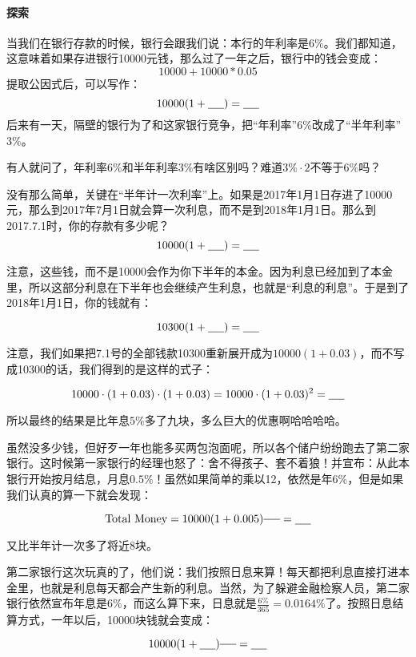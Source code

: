 \documentclass[UTF8]{ctexart}
\begin{document}
\paragraph{探索}
当我们在银行存款的时候，银行会跟我们说：本行的年利率是$6\%$。我们都知道，这意味着如果存进银行10000元钱，那么过了一年之后，银行中的钱会变成：
\[10000+10000*0.05\]
提取公因式后，可以写作：
\[10000(1+\underline{\hbox to 5mm{}}) = \underline{\hbox to 5mm{}}\]
后来有一天，隔壁的银行为了和这家银行竞争，把“年利率”$6\%$改成了“半年利率”$3\%$。

有人就问了，年利率$6\%$和半年利率$3\%$有啥区别吗？难道$3\% \cdot 2$不等于$6\%$吗？

没有那么简单，关键在“半年计一次利率”上。如果是2017年1月1日存进了10000元，那么到2017年7月1日就会算一次利息，而不是到2018年1月1日。那么到2017.7.1时，你的存款有多少呢？
\[10000(1+\underline{\hbox to 5mm{}}) = \underline{\hbox to 5mm{}}\]

注意，这些钱，而不是10000会作为你下半年的本金。因为利息已经加到了本金里，所以这部分利息在下半年也会继续产生利息，也就是“利息的利息”。于是到了2018年1月1日，你的钱就有：

\[10300(1+\underline{\hbox to 5mm{}}) = \underline{\hbox to 5mm{}}\]

注意，我们如果把7.1号的全部钱款10300重新展开成为$10000(1+0.03)$，而不写成10300的话，我们得到的是这样的式子：

\[10000\cdot(1+0.03)\cdot(1+0.03) = 10000\cdot(1+0.03)^2= \underline{\hbox to 5mm{}}\]

所以最终的结果是比年息$5\%$多了九块，多么巨大的优惠啊哈哈哈哈。

虽然没多少钱，但好歹一年也能多买两包泡面呢，所以各个储户纷纷跑去了第二家银行。这时候第一家银行的经理也怒了：舍不得孩子、套不着狼！并宣布：从此本银行开始按月结息，月息$0.5\%$！虽然如果简单的乘以12，依然是年$6\%$，但是如果我们认真的算一下就会发现：

\[\text{Total Money} = 10000(1+0.005)^{\underline{\hbox to 5mm{}}} = \underline{\hbox to 5mm{}}\]

又比半年计一次多了将近8块。

第二家银行这次玩真的了，他们说：我们按照日息来算！每天都把利息直接打进本金里，也就是利息每天都会产生新的利息。当然，为了躲避金融检察人员，第二家银行依然宣布年息是$6\%$，而这么算下来，日息就是$\frac{6\%}{365} = 0.0164\%$了。按照日息结算方式，一年以后，10000块钱就会变成：

\[10000(1+\underline{\hbox to 5mm{}})^{\underline{\hbox to 5mm{}}} = \underline{\hbox to 5mm{}}\]
\end{document}
